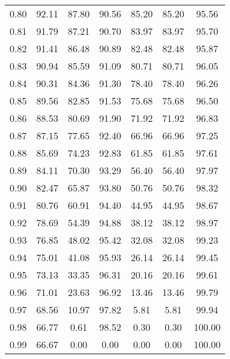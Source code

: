 \begin{tabular}{|c|c|c|c|c|c|c|}
      0.80 &     92.11 &     87.80 &      90.56 &   85.20 &      85.20 &         95.56 \\
      0.81 &     91.79 &     87.21 &      90.70 &   83.97 &      83.97 &         95.70 \\
      0.82 &     91.41 &     86.48 &      90.89 &   82.48 &      82.48 &         95.87 \\
      0.83 &     90.94 &     85.59 &      91.09 &   80.71 &      80.71 &         96.05 \\
      0.84 &     90.31 &     84.36 &      91.30 &   78.40 &      78.40 &         96.26 \\
      0.85 &     89.56 &     82.85 &      91.53 &   75.68 &      75.68 &         96.50 \\
      0.86 &     88.53 &     80.69 &      91.90 &   71.92 &      71.92 &         96.83 \\
      0.87 &     87.15 &     77.65 &      92.40 &   66.96 &      66.96 &         97.25 \\
      0.88 &     85.69 &     74.23 &      92.83 &   61.85 &      61.85 &         97.61 \\
      0.89 &     84.11 &     70.30 &      93.29 &   56.40 &      56.40 &         97.97 \\
      0.90 &     82.47 &     65.87 &      93.80 &   50.76 &      50.76 &         98.32 \\
      0.91 &     80.76 &     60.91 &      94.40 &   44.95 &      44.95 &         98.67 \\
      0.92 &     78.69 &     54.39 &      94.88 &   38.12 &      38.12 &         98.97 \\
      0.93 &     76.85 &     48.02 &      95.42 &   32.08 &      32.08 &         99.23 \\
      0.94 &     75.01 &     41.08 &      95.93 &   26.14 &      26.14 &         99.45 \\
      0.95 &     73.13 &     33.35 &      96.31 &   20.16 &      20.16 &         99.61 \\
      0.96 &     71.01 &     23.63 &      96.92 &   13.46 &      13.46 &         99.79 \\
      0.97 &     68.56 &     10.97 &      97.82 &    5.81 &       5.81 &         99.94 \\
      0.98 &     66.77 &      0.61 &      98.52 &    0.30 &       0.30 &        100.00 \\
      0.99 &     66.67 &      0.00 &       0.00 &    0.00 &       0.00 &        100.00 \\
\bottomrule
\end{tabular}
